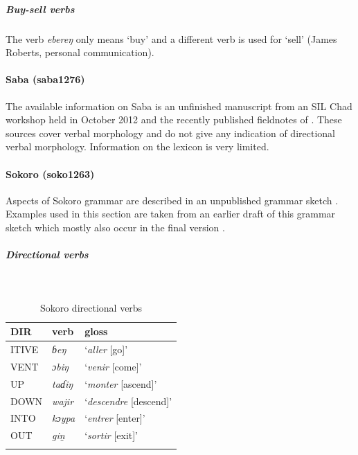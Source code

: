 \subparagraph{Buy-sell verbs}

The verb \textit{ebereŋ} only means `buy' and a different verb is used for `sell' (James Roberts, personal communication).

\paragraph*{Saba (saba1276)}

The available information on Saba is an unfinished manuscript from an SIL Chad workshop held in October 2012 \citep{abakarEsquisseGrammaticaleLanguen.d.} and the recently published fieldnotes of \citet{jungraithmayrPreliminairesEtudeSaba2020}. These sources cover verbal morphology and do not give any indication of directional verbal morphology. Information on the lexicon is very limited. 

\paragraph*{Sokoro (soko1263)} \label{soko}

Aspects of Sokoro grammar are described in an unpublished grammar sketch \citep{yarangaEsquisseGrammaticaleLangue2019}. Examples used in this section are taken from an earlier draft of this grammar sketch which mostly also occur in the final version \citep{yarangaEsquiseGrammaticaleLanguen.d.}.

\subparagraph{Directional verbs}~

\begin{table}[H]
	\caption{Sokoro directional verbs} 
	\label{tab:sokoV}
	\begin{tabular}{lll} %
		\lsptoprule
		DIR & verb & gloss   \\ %
		\midrule
		ITIVE & \textit{ɓeŋ} & `\textit{aller} [go]' \\
		VENT & \textit{ɔbiŋ} & `\textit{venir} [come]' \\
		UP & \textit{taɗiŋ} &  `\textit{monter} [ascend]' \\
		DOWN & \textit{wajir} & `\textit{descendre} [descend]' \\
		INTO& \textit{kɔypa} &  `\textit{entrer} [enter]' \\
		OUT & \textit{gin̰} & `\textit{sortir} [exit]' \\
		\lspbottomrule
	\end{tabular}
\end{table}

